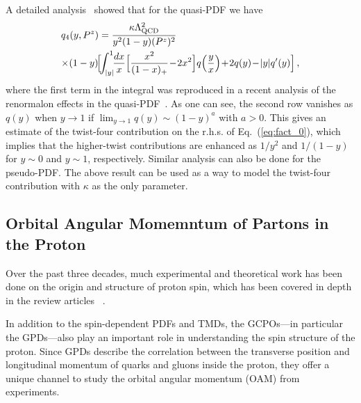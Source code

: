 \documentclass[aps,rmp,reprint,amsmath,amssymb,graphicx,longbibliography]{revtex4-1} %
\newcommand{\nn}{\nonumber}
\begin{document}
A detailed analysis~\cite{Braun:2018brg} showed that for the quasi-PDF we have
\begin{align}
	\label{t4-Qparallel}
	& {q}_4(y,P^z) =\frac{\kappa  \Lambda_{\rm QCD}^2}{y^2(1-y) (P^z)^2}\\
	&\hspace{-.2em}\times \hspace{-.2em}(1-y)\!\Big[\!\!
	\int_{|y|}^1 \!\!\frac{dx}{x} \Big[\frac{x^2}{(1-x)_+}\!-\!2x^2\Big]q\Big(\frac{y}{x}\Big)\!
	+\! 2q(y)\! -\! |y|q'(y) \Big]\,,\nn
\end{align}
where the first term in the integral was reproduced in a recent analysis of the renormalon effects in the quasi-PDF~\cite{Liu:2020rqi}. As one can see, the second row vanishes as $q(y)$ when $y\to1$ if $\lim_{y\to1}q(y)\sim (1-y)^a$ with $a>0$.
This gives an estimate of the twist-four contribution on the r.h.s. of Eq.~(\ref{eq:fact_0}), which  implies that the higher-twist contributions are enhanced as $1/y^2$ and $1/(1-y)$ for $y\sim 0$ and $y\sim 1$, respectively. Similar analysis can also be done for the pseudo-PDF.
The above result can be used as a way to model the twist-four contribution with $\kappa$ as the only parameter.

\subsection{Orbital Angular Momemntum of Partons in the Proton}
\label{sec:spin}

Over the past three decades, much experimental and theoretical
work has been done on the origin and structure of proton spin, which has been covered in depth in the review articles
~\cite{Filippone:2001ux,Bass:2004xa,Aidala:2012mv,Leader:2013jra,Ji:2016djn,Deur:2018roz,Ji:2020ena}.

In addition to the spin-dependent PDFs and TMDs, the GCPOs---in particular the GPDs---also play an important role in understanding the spin structure of the proton. Since GPDs describe the correlation between the transverse position and longitudinal momentum of quarks and gluons inside the proton, they offer a unique channel to study the orbital angular momentum (OAM) from experiments.
\end{document}
